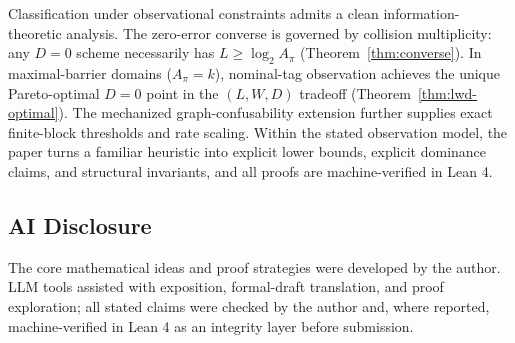 Classification under observational constraints admits a clean information-theoretic analysis. The zero-error converse is governed by collision multiplicity: any $D=0$ scheme necessarily has $L \ge \log_2 A_\pi$ (Theorem~\ref{thm:converse}). In maximal-barrier domains ($A_\pi=k$), nominal-tag observation achieves the unique Pareto-optimal $D=0$ point in the $(L, W, D)$ tradeoff (Theorem~\ref{thm:lwd-optimal}). The mechanized graph-confusability extension further supplies exact finite-block thresholds and rate scaling. Within the stated observation model, the paper turns a familiar heuristic into explicit lower bounds, explicit dominance claims, and structural invariants, and all proofs are machine-verified in Lean 4.

\subsection*{AI Disclosure}

The core mathematical ideas and proof strategies were developed by the author. LLM tools assisted with exposition, formal-draft translation, and proof exploration; all stated claims were checked by the author and, where reported, machine-verified in Lean 4 as an integrity layer before submission.
